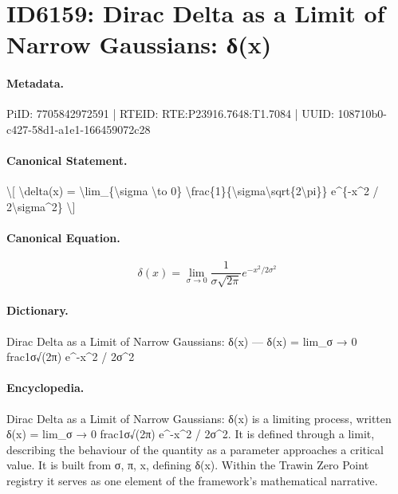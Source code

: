 \section*{ID6159: Dirac Delta as a Limit of Narrow Gaussians: δ(x)}
\paragraph{Metadata.}
PiID: 7705842972591 | RTEID: RTE:P23916.7648:T1.7084 | UUID: 108710b0-c427-58d1-a1e1-166459072c28

\paragraph{Canonical Statement.}
\textbackslash{}[ \textbackslash{}delta(x) = \textbackslash{}lim\_\{\textbackslash{}sigma \textbackslash{}to 0\} \textbackslash{}frac\{1\}\{\textbackslash{}sigma\textbackslash{}sqrt\{2\textbackslash{}pi\}\} e\textasciicircum{}\{-x\textasciicircum{}2 / 2\textbackslash{}sigma\textasciicircum{}2\} \textbackslash{}]

\paragraph{Canonical Equation.}
\[
\delta(x) = \lim_{\sigma \to 0} \frac{1}{\sigma\sqrt{2\pi}} e^{-x^2 / 2\sigma^2}
\]

\paragraph{Dictionary.}
Dirac Delta as a Limit of Narrow Gaussians: δ(x) — δ(x) = lim\_σ → 0 frac1σ√(2π) e\textasciicircum{}-x\textasciicircum{}2 / 2σ\textasciicircum{}2

\paragraph{Encyclopedia.}
Dirac Delta as a Limit of Narrow Gaussians: δ(x) is a limiting process, written δ(x) = lim\_σ → 0 frac1σ√(2π) e\textasciicircum{}-x\textasciicircum{}2 / 2σ\textasciicircum{}2. It is defined through a limit, describing the behaviour of the quantity as a parameter approaches a critical value. It is built from σ, π, x, defining δ(x). Within the Trawin Zero Point registry it serves as one element of the framework's mathematical narrative.

